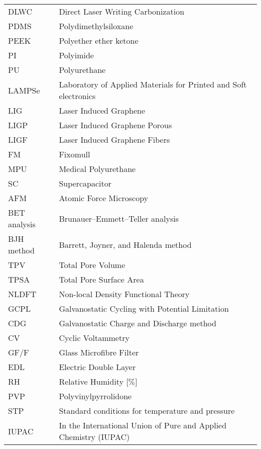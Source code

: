 

\renewcommand*{\arraystretch}{1.37}
\begin{longtable}{@{}l @{\hspace{5mm}} l }%

DLWC & Direct Laser Writing Carbonization\\[15px]
PDMS &  Polydimethylsiloxane\\[15px]
PEEK & Polyether ether ketone\\[15px]
PI & Polyimide\\[15px]
PU & Polyurethane \\[15px]
LAMPSe & Laboratory of Applied Materials for Printed and Soft electronics\\[15px]
LIG & Laser Induced Graphene\\[15px]
LIGP & Laser Induced Graphene Porous \\[15px]
LIGF & Laser Induced Graphene Fibers \\[15px]
FM & Fixomull \\[15px]
MPU & Medical Polyurethane \\[15px]
SC & Supercapacitor \\[15px]
AFM & Atomic Force Microscopy\\[15px]
BET analysis & Brunauer–Emmett–Teller analysis \\[15px]
BJH method & Barrett, Joyner, and Halenda method  \\[15px]
TPV & Total Pore Volume\\[15px]
TPSA & Total Pore Surface Area\\[15px]
NLDFT & Non-local Density Functional Theory\\[15px]
GCPL & Galvanostatic Cycling with Potential Limitation\\[15px]
CDG & Galvanostatic Charge and Discharge method\\[15px]
CV & Cyclic Voltammetry\\[15px]
GF/F & Glass Microfibre Filter\\[15px]
EDL & Electric Double Layer  \\[15px]
RH & Relative Humidity [$\%$]\\[15px]
PVP & Polyvinylpyrrolidone \\[15px]
STP & Standard conditions for temperature and pressure\\[15px]
IUPAC & In the International Union of Pure and Applied Chemistry (IUPAC)\\[15px]

\end{longtable}
